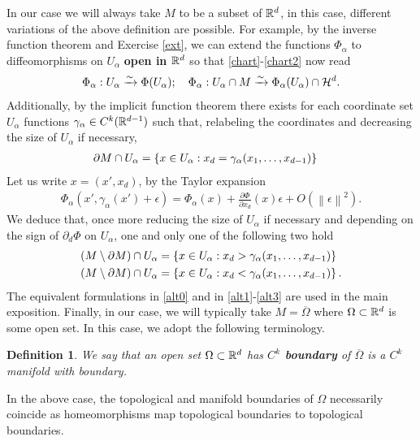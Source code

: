 \documentclass[12pt]{article}
\newtheorem{definition}{Definition}
\theoremstyle{remark}
\renewcommand{\norm}[1]{\left\lVert #1 \right\rVert}\renewcommand{\abs}[1]{\left| #1 \right|}
\newcommand{\iso}{\xrightarrow{\sim}}
\begin{document}
In our case we will always take $M$ to be a subset of  $\mathbb{R}^d$, in this case, different variations of the above definition are possible. For example, by the inverse function theorem and Exercise \ref{ext}, we can extend the functions $\Phi_\alpha$ to diffeomorphisms on $U_\alpha$ \textbf{open in $\mathbb{R}^d$} so that \eqref{chart}-\eqref{chart2} now read
\begin{align}\label{alt0}
	\Phi_\alpha : U_\alpha \iso  \Phi(U_\alpha); \quad    \Phi_\alpha : U_\alpha \cap M \iso  \Phi_\alpha(U_\alpha) \cap \Hh^d .
\end{align}
Additionally, by the implicit function theorem there exists for each coordinate set $U_\alpha$  functions $\gamma_\alpha \in C^k(\mathbb{R}^{d-1}) $ such that, relabeling the coordinates and decreasing the size of $U_\alpha$ if necessary,
\begin{align}\label{alt1}
	\partial M \cap U_\alpha & =\left\{x \in U_\alpha : x_d=\gamma_\alpha(x_1,\ldots,x_{d-1}) \right\}
\end{align}
Let us write $x=(x',x_d)$, by the Taylor expansion
\begin{align*}
	\Phi_\alpha(x',\gamma _\alpha(x')+\epsilon)=\Phi_\alpha(x)+\frac{\partial \Phi}{\partial x_d}(x)\epsilon +O(\norm{\epsilon }^2)  .
\end{align*}
We deduce that,  once more reducing the size of $U_\alpha$ if necessary and depending on the sign of $\partial _d \Phi$ on $U_\alpha$, one and only one of the following two hold
\begin{align}\label{alt3}
	(M \setminus \partial M) \cap U_\alpha & =\left\{x \in U_\alpha : x_d>\gamma_\alpha(x_1,\ldots,x_{d-1}) \right\}        \\
	(M \setminus \partial M) \cap U_\alpha & =\left\{x \in U_\alpha : x_d<\gamma_\alpha(x_1,\ldots,x_{d-1}) \right\}\notag.
\end{align}
The equivalent formulations in \eqref{alt0} and in \eqref{alt1}-\eqref{alt3} are used in the main exposition. Finally, in our case, we will typically take $M =\overline{\Omega}$ where $\Omega \subset \mathbb{R}^d$ is some open set. In this case, we adopt the following terminology.
\begin{definition}
	We say that an open set $\Omega\subset \mathbb{R}^d$ has \textbf{$C^k$ boundary} of  $\overline{\Omega}$ is a $C^k$ manifold with boundary.
\end{definition}
In the above case, the topological and manifold boundaries of $\Omega$ necessarily coincide as homeomorphisms map topological boundaries to topological boundaries.











\end{document}
